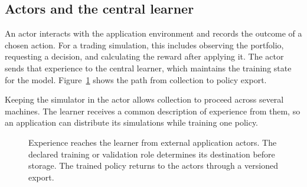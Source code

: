 \documentclass{strategynet-journal}
\begin{document}
\subsection{Actors and the central learner}

An actor interacts with the application environment and records the outcome
of a chosen action. For a trading simulation, this includes observing the
portfolio, requesting a decision, and calculating the reward after applying
it. The actor sends that experience to the central learner, which maintains
the training state for the model. Figure~\ref{fig:system} shows the path from
collection to policy export.

Keeping the simulator in the actor allows collection to proceed across
several machines. The learner receives a common description of experience
from them, so an application can distribute its simulations while training
one policy.

\begin{figure}[H]
\centering
{}%
\caption{Experience reaches the learner from external application actors.
The declared training or validation role determines its destination before
storage. The trained policy returns to the actors through a versioned export.}

\label{fig:system}
\end{figure}
\end{document}
